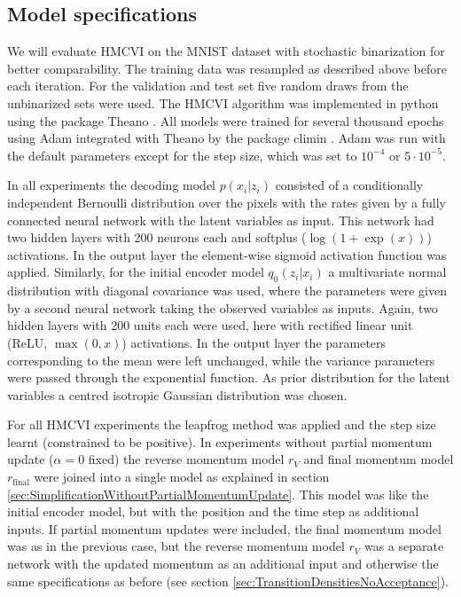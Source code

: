 \subsection{Model specifications}
\label{sec:ModelSpecifications}
We will evaluate HMCVI on the MNIST dataset with stochastic binarization for better comparability. The training data was resampled as described above before each iteration. For the validation and test set five random draws from the unbinarized sets were used. The HMCVI algorithm was implemented in python using the package Theano \parencite{Bergstra2010, Bastien2012}. All models were trained for several thousand epochs using Adam \parencite{Kingma2015} integrated with Theano by the package climin \parencite{Bayer2015}. Adam was run with the default parameters except for the step size, which was set to $10^{-4}$ or $5 \cdot 10^{-5}$.

In all experiments the decoding model $p(x_i|z_i)$ consisted of a conditionally independent Bernoulli distribution over the pixels with the rates given by a fully connected neural network with the latent variables as input. This network had two hidden layers with 200 neurons each and softplus ($\log(1 + \exp(x))$) activations. In the output layer the element-wise sigmoid activation function was applied. Similarly, for the initial encoder model $q_0(z_i|x_i)$ a multivariate normal distribution with diagonal covariance was used, where the parameters were given by a second neural network taking the observed variables as inputs. Again, two hidden layers with 200 units each were used, here with rectified linear unit (ReLU, $\max(0, x)$) activations. In the output layer the parameters corresponding to the mean were left unchanged, while the variance parameters were passed through the exponential function. As prior distribution for the latent variables a centred isotropic Gaussian distribution was chosen. 

For all HMCVI experiments the leapfrog method was applied and the step size learnt (constrained to be positive). In experiments without partial momentum update ($\alpha = 0$ fixed) the reverse momentum model $r_V$ and final momentum model $r_\textrm{final}$ were joined into a single model as explained in section \ref{sec:SimplificationWithoutPartialMomentumUpdate}. This model was like the initial encoder model, but with the position and the time step as additional inputs. If partial momentum updates were included, the final momentum model was as in the previous case, but the reverse momentum model $r_V$ was a separate network with the updated momentum as an additional input and otherwise the same specifications as before (see section \ref{sec:TransitionDensitiesNoAcceptance}).

